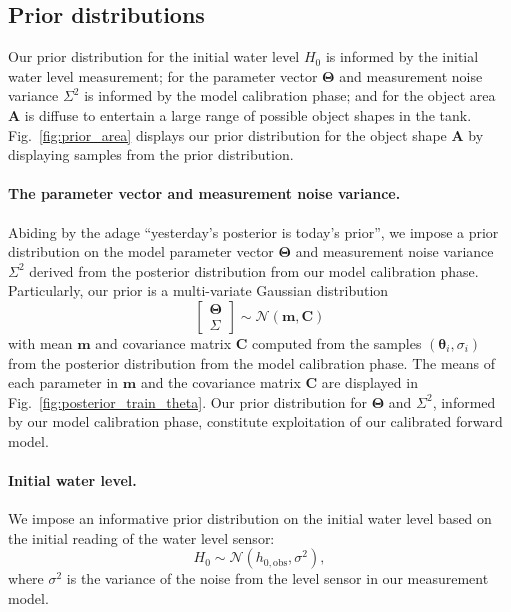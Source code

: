 \documentclass[openacc]{rsproca_new}%
\begin{document}
\subsection{Prior distributions}
Our prior distribution for the initial water level $H_0$ is informed by the initial water level measurement; for the parameter vector $\boldsymbol \Theta$ and measurement noise variance $\Sigma^2$ is informed by the model calibration phase; and for the object area $\mathbf{A}$ is diffuse to entertain a large range of possible object shapes in the tank. Fig.~\ref{fig:prior_area} displays our prior distribution for the object shape $\mathbf{A}$ by displaying samples from the prior distribution. 

\vspace{-\baselineskip}
\paragraph{The parameter vector and measurement noise variance.}
Abiding by the adage ``yesterday's posterior is today's prior'', we impose a prior distribution on the model parameter vector $\boldsymbol \Theta$ and measurement noise variance $\Sigma^2$ derived from the posterior distribution from our model calibration phase. Particularly, our prior is a multi-variate Gaussian distribution
\begin{equation}
	\begin{bmatrix} \boldsymbol \Theta \\ \Sigma \end{bmatrix} \sim \mathcal{N}(\mathbf{m}, \mathbf{C})
\end{equation}
with mean $\mathbf{m}$ and covariance matrix $\mathbf{C}$ computed from the samples $(\boldsymbol \theta_i, \sigma_i)$ from the posterior distribution from the model calibration phase. 
The means of each parameter in $\mathbf{m}$ and the covariance matrix $\mathbf{C}$ are displayed in Fig.~\ref{fig:posterior_train_theta}. 
Our prior distribution for $\boldsymbol \Theta$ and $\Sigma^2$, informed by our model calibration phase, constitute exploitation of our calibrated forward model. 

\vspace{-\baselineskip}
\paragraph{Initial water level.} We impose an informative prior distribution on the initial water level based on the initial reading of the water level sensor:
\begin{equation}
	H_0 \sim \mathcal{N}(h_{0, \text{obs}}, \sigma^2),
\end{equation} where $\sigma^2$ is the variance of the noise from the level sensor in our measurement model.
\end{document}
